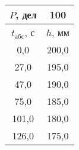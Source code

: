 \begin{tabular}[t]{|c|c|}
\hline
$P$, дел & 100 \\
\hline
$t_{абс}$, с & $h$, мм \\ 
\hline
0,0 & 200,0 \\ 
27,0 & 195,0 \\ 
47,0 & 190,0 \\ 
75,0 & 185,0 \\ 
101,0 & 180,0 \\ 
126,0 & 175,0 \\ 
\hline
\end{tabular}